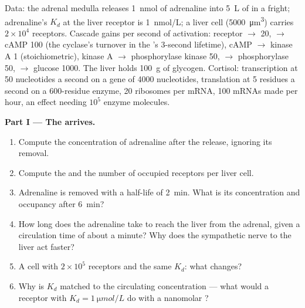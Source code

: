 \begin{problem}
\label{pb:b2:cell-signalling:1}
Data: the adrenal medulla releases \qty{1}{nmol} of adrenaline into
\qty{5}{L} of  in a fright; adrenaline's $K_d$ at the liver
receptor is \qty{1}{nmol/L}; a liver cell (\qty{5000}{\micro m^3})
carries $2\times 10^{4}$ receptors. Cascade gains per second of
activation: receptor $\to$  20,  $\to$ cAMP 100
(the cyclase's turnover in the 's 3-second lifetime),
cAMP $\to$ kinase A 1 (stoichiometric), kinase A $\to$ phosphorylase
kinase 50, $\to$ phosphorylase 50, $\to$ glucose 1000. The liver
holds \qty{100}{g} of glycogen. Cortisol: transcription at
\qty{50}{} nucleotides a second on a gene of \qty{4000}{}
nucleotides, translation at \qty{5}{} residues a second on a
\num{600}-residue enzyme, \num{20} ribosomes per mRNA, \num{100}
mRNAs made per hour, an effect needing $10^{5}$ enzyme molecules.

\medskip
\noindent\textbf{Part I --- The  arrives.}
\begin{enumerate}
  \item Compute the  concentration of adrenaline after the
        release, ignoring its removal.
  \item Compute the  and the number of occupied
        receptors per liver cell.
  \item Adrenaline is removed with a half-life of \qty{2}{min}. What
        is its concentration and occupancy after \qty{6}{min}?
  \item How long does the adrenaline take to reach the liver from
        the adrenal, given a circulation time of about a minute? Why
        does the sympathetic nerve to the liver act faster?
  \item A cell with $2\times 10^{5}$ receptors and the same $K_d$:
        what changes?
  \item Why is $K_d$ matched to the circulating concentration ---
        what would a receptor with $K_d = \qty{1}{\micro mol/L}$ do
        with a nanomolar ?
\end{enumerate}


\end{problem}
